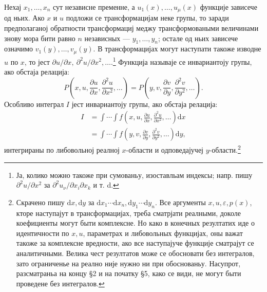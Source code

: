 ﻿\documentclass[11pt]{article}
\providecommand{\eps}{\varepsilon}
\providecommand{\p}{\partial}
\providecommand{\dd}{\mathrm d}
\begin{document}
Нехај \(x_1,\ldots,x_n\) сут независне пременне, а \(u_1(x),\ldots,u_\mu(x)\) функције зависече од ньих. Ако \(x\) и \(u\) подложи се трансформацијам неке групы, то заради предполаганој обратности трансформациј меджу трансформоваными величинами знову мора бити равно \(n\) независных --- \(y_1,\ldots,y_n\); остале од ньих зависече означимо \(v_1(y),\ldots,v_\mu(y)\). В трансформацијах могут наступати такоже изводне \(u\) по \(x\), то јест \(\p u/\p x,\ \p^2u/\p x^2,\ldots\).\footnote{Ја, колико можно такоже при сумованьу, изоставльам индексы; напр. пишу \(\p^2u/\p x^2\) за \(\p^2u_\nu/\p x_i\p x_k\) и т. d.} Функција называје се инвариантоју групы, ако обстаја релација:
\[
P\!\left(x,u,\frac{\p u}{\p x},\frac{\p^2u}{\p x^2},\ldots\right)
 =
P\!\left(y,v,\frac{\p v}{\p y},\frac{\p^2v}{\p y^2},\ldots\right).
\]
Особливо интеграл \(I\) јест инвариантоју групы, ако обстаја релација:
\begin{equation}
\begin{aligned}
I&=\int\!\cdots\!\int f\!\left(x,u,\frac{\p u}{\p x},\frac{\p^2u}{\p x^2},\ldots\right)\dd x\\
 &=\int\!\cdots\!\int f\!\left(y,v,\frac{\p v}{\p y},\frac{\p^2v}{\p y^2},\ldots\right)\dd y,
\end{aligned}
\tag{1}
\end{equation}
интегрираны по либовольној реалној \(x\)-области и одповедајучеј \(y\)-области.\footnote{Скрачено пишу \(\dd x,\dd y\) за \(\dd x_1\cdots \dd x_n,\dd y_1\cdots \dd y_n\). Все аргументы \(x,u,\eps,p(x)\), кторе наступајут в трансформацијах, треба сматрјати реалными, доколе коефициенты могут быти комплексне. Но како в конечных резултатих иде о идентичности по \(x,u\), параметрах и либовольных функцијах, оны важат такоже за комплексне вредности, ако все наступајуче функције сматрајут се аналитичными. Велика чест резултатов може се обосновати без интегралов, зато ограниченье на реално није нужно ни при обоснованьу. Насупрот, разсматраньа на концу \S{}2 и на початку \S{}5, како се види, не могут быти проведене без интегралов.}
\end{document}
